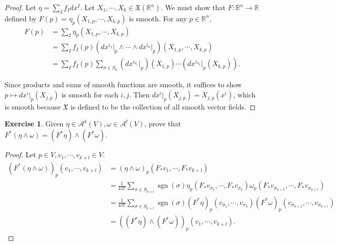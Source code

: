 \documentclass[12pt, psamsfonts]{amsart}
\theoremstyle{definition}
\newtheorem*{exer}{Exercise}
\theoremstyle{remark}
\DeclareMathOperator{\sgn}{sgn}
\numberwithin{equation}{section}
\begin{document}
\begin{proof}
  Let $\eta = \sum_{I} f_Idx^I$.
  Let $X_1, \cdots, X_k \in \mathfrak{X}(\mathbb{R}^n)$.
  We must show that $F: \mathbb{R}^n \rightarrow \mathbb{R}$ defined by $F(p) = \eta_p(X_{1, p}, \cdots, X_{k, p})$ is smooth.
  For any $p \in \mathbb{R}^n$,
  \begin{align*}
    F(p)
      &= \sum_{I} \eta_p(X_{1, p}, \cdots, X_{k, p}) \\
      &= \sum_{I} f_I(p)(dx^{i_1}\vert_p \wedge \cdots \wedge dx^{i_k}\vert_p)(X_{1, p}, \cdots, X_{k, p}) \\
      &= \sum_{I} f_I(p) \sum_{\sigma \in S_k} (dx^{i_{\sigma_1}}\vert_p)(X_{1, p}) \cdots (dx^{i_{\sigma_k}}\vert_p(X_{k, p})).
  \end{align*}

  Since products and sums of smooth functions are smooth, it suffices to show $p \mapsto dx^{i}\vert_p(X_{j, p})$ is smooth for each $i, j$.
  Then $dx^i\vert_p(X_{j, p}) = X_{j, p}(x^i)$, which is smooth because $\mathfrak{X}$ is defined to be the collection of all smooth vector fields.
\end{proof}

\begin{exer}
  Given $\eta \in \mathscr{A}^k(V), \omega \in \mathscr{A}^l(V)$, prove that $F^*(\eta \wedge \omega) = (F^*\eta) \wedge (F^*\omega)$.
\end{exer}

\begin{proof}
  Let $p \in V, v_1, \cdots, v_{k + l} \in V$.
  \begin{align*}
    (F^*(\eta \wedge \omega))_p(v_1, \cdots, v_{k + l})
      &= (\eta \wedge \omega)_p(F_*v_1, \cdots, F_*v_{k + l}) \\
      &= \frac{1}{k!l!}\sum_{\sigma \in S_{k + l}} \sgn(\sigma) \eta_p(F_*v_{\sigma_1}, \cdots, F_*v_{\sigma_k})\omega_p(F_*v_{\sigma_{k + 1}}, \cdots, F_*v_{\sigma_{k + l}}) \\
      &= \frac{1}{k!l!}\sum_{\sigma \in S_{k + l}} \sgn(\sigma) (F^*\eta)_p(v_{\sigma_1}, \cdots, v_{\sigma_k})(F^*\omega)_p(v_{\sigma_{k + 1}}, \cdots, v_{\sigma_{k + l}}) \\
      &= ((F^*\eta) \wedge (F^*\omega))_p(v_1, \cdots, v_{k + l}).
  \end{align*}
\end{proof}
\end{document}
